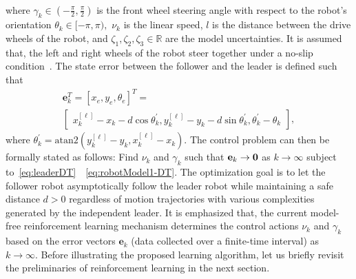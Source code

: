 \documentclass[conference]{IEEEtran}
\begin{document}
\\
where $\gamma_k\in(-\frac{\pi}{2},\frac{\pi}{2})$ is the front wheel steering angle with respect to the robot's orientation $\theta_k\in[-\pi,\pi),$ $\nu_k$ is the linear speed, $l$ is the distance between the drive wheels of the robot, and $\zeta_1,\zeta_2,\zeta_3\in\mathbb{R}$ are the model uncertainties. %
%
It is assumed that, the left and right wheels of the robot steer together under a no-slip condition~\cite{Corke2011}. The state error between the follower and the leader is defined such that %
%
\begin{multline}
    \label{eq:stateError}
  \mathbf{e}_k^T = [x_e,y_e,\theta_e]^T = \\
  \begin{bmatrix}
    x_k^{[\ell]} - x_k - d\cos\theta_k^{'},
    y_k^{[\ell]} - y_k - d\sin\theta_k^{'},
    \theta_k^{'} - \theta_k
  \end{bmatrix},
\end{multline}
%
where $\theta_k^{'} = \mathrm{atan2}\left(y_k^{[\ell]}-y_k, x_k^{[\ell]}-x_k\right).$  %
%
The control problem can then be formally stated as follows: Find $\nu_k$ and $\gamma_k$ such that ${\bf e}_k\to {\bf 0}$ as  $k\to\infty$ subject to~\eqref{eq:leaderDT}~~\eqref{eq:robotModel1-DT}. %
%
The optimization goal is to let the follower robot asymptotically follow the leader robot while maintaining a safe distance $d>0$ regardless of motion trajectories with various complexities generated by the independent leader. It is emphasized that, the current model-free reinforcement learning mechanism determines  the control actions $\nu_k$ and $\gamma_k$ based on the error vectors $\mathbf{e}_k$ (data collected over a finite-time interval) as $k\to\infty.$ Before illustrating the proposed learning algorithm, let us briefly revisit the preliminaries of reinforcement learning in the next section. 
\end{document}
